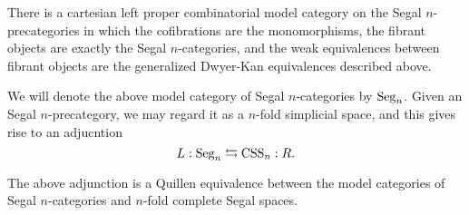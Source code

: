 \documentclass{amsart}
\begin{document}
\begin{theorem} %
	There is a cartesian left proper combinatorial model category on the Segal $n$-precategories in which the cofibrations are the monomorphisms, the fibrant objects are exactly the Segal $n$-categories, and the weak equivalences between fibrant objects are the generalized Dwyer-Kan equivalences described above. 
\end{theorem}

\noindent We will denote the above model category of Segal $n$-categories by $\mathrm{Seg}_n$. Given an Segal $n$-precategory, we may regard it as a $n$-fold simplicial space, and this gives rise to an adjucntion
\begin{equation} \label{Eqn-SegCSS}
	L:\mathrm{Seg}_n \leftrightarrows \mathrm{CSS}_n:R.
\end{equation}
\begin{theorem} \label{thm:SegnCSSnQuillenEquiv}
	The above adjunction is a Quillen equivalence between the model categories of Segal $n$-categories and $n$-fold complete Segal spaces. 
\end{theorem}
\end{document}
